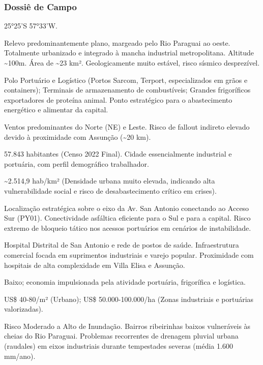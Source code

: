 \subsubsection{Dossiê de Campo}
\begin{description}[style=nextline,leftmargin=0.5cm,font=\bfseries]
\item[Coordenadas]  25°25'S 57°33'W.
\item[Topografia]  Relevo predominantemente plano, margeado pelo Rio Paraguai ao oeste. Totalmente urbanizado e integrado à mancha industrial metropolitana. Altitude \textasciitilde 100m. Área de \textasciitilde 23 km². Geologicamente muito estável, risco sísmico desprezível.
\item[Alvos Estratégicos]  Polo Portuário e Logístico (Portos Sarcom, Terport, especializados em grãos e containers); Terminais de armazenamento de combustíveis; Grandes frigoríficos exportadores de proteína animal. Ponto estratégico para o abastecimento energético e alimentar da capital.
\item[Fallout]  Ventos predominantes do Norte (NE) e Leste. Risco de fallout indireto elevado devido à proximidade com Assunção (\textasciitilde 20 km).
\item[População]  57.843 habitantes (Censo 2022 Final). Cidade essencialmente industrial e portuária, com perfil demográfico trabalhador.
\item[Densidade]  \textasciitilde 2.514,9 hab/\allowbreak km² (Densidade urbana muito elevada, indicando alta vulnerabilidade social e risco de desabastecimento crítico em crises).
\item[Vias de Acesso]  Localização estratégica sobre o eixo da Av. San Antonio conectando ao Acceso Sur (PY01). Conectividade asfáltica eficiente para o Sul e para a capital. Risco extremo de bloqueio tático nos acessos portuários em cenários de instabilidade.
\item[Serviços]  Hospital Distrital de San Antonio e rede de postos de saúde. Infraestrutura comercial focada em suprimentos industriais e varejo popular. Proximidade com hospitais de alta complexidade em Villa Elisa e Assunção.
\item[Custo de Vida]  Baixo; economia impulsionada pela atividade portuária, frigorífica e logística.
\item[Preço da Terra]  US\$ 40-80/\allowbreak m² (Urbano); US\$ 50.000-100.000/\allowbreak ha (Zonas industriais e portuárias valorizadas).
\item[Hidrologia]  Risco Moderado a Alto de Inundação. Bairros ribeirinhas baixos vulneráveis às cheias do Rio Paraguai. Problemas recorrentes de drenagem pluvial urbana (raudales) em eixos industriais durante tempestades severas (média 1.600 mm/\allowbreak ano).

\end{description}

